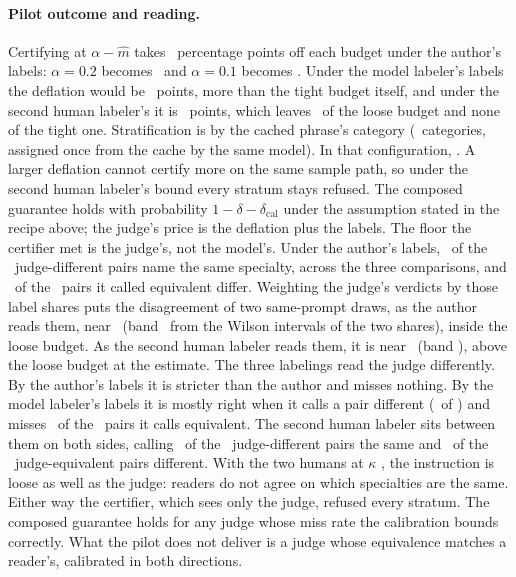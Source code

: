 \paragraph{Pilot outcome and reading.} Certifying at $\alpha - \hat{m}$
takes \pilotMissUcbPts\ percentage points off each budget under the
author's labels: $\alpha{=}0.2$ becomes
\pilotAlphaLooseEff\ and $\alpha{=}0.1$ becomes \pilotAlphaTightEff.
Under the model labeler's labels the deflation would be
\pilotAdjMissUcbPts\ points, more than the tight budget itself, and
under the second human labeler's it is \pilotSecondMissUcbPts\ points,
which leaves \pilotSecondAlphaLooseEff\ of the loose budget and none of
the tight one.
Stratification is by the cached phrase's category
(\pilotCategories\ categories, assigned once from the cache by the same
model). In that configuration,
\pilotOutcomes. A larger deflation cannot certify more on the same
sample path, so under the second human labeler's bound every stratum
stays refused. The composed guarantee holds with
probability $1-\delta-\delta_{\mathrm{cal}}$ under the assumption
stated in the recipe above; the judge's price is the deflation plus the labels. The
floor the certifier met is the judge's, not the model's. Under the
author's labels, \pilotFalseFlips\ of the \pilotLabeledDiff\
judge-different pairs name the same specialty, across the three
comparisons, and \pilotMisses\ of the \pilotLabeledSame\ pairs it
called equivalent differ. Weighting the judge's verdicts by those
label shares puts the disagreement of two same-prompt draws, as the
author reads them, near \pilotImpliedFloor\ (band
\pilotImpliedFloorBand\ from the Wilson intervals of the two shares),
inside the loose budget. As the second human labeler reads them, it is
near \pilotSecondImpliedFloor\ (band \pilotSecondImpliedFloorBand),
above the loose budget at the estimate. The three labelings read the judge differently.
By the author's labels it is stricter than the author and misses
nothing. By the model labeler's labels it is mostly right when it calls a pair
different (\pilotAdjDiffOnJudgeDiff\ of \pilotLabeledDiff) and misses
\pilotAdjMissesOnJudgeSame\ of the \pilotLabeledSame\ pairs it calls
equivalent. The second human labeler sits between them on both sides,
calling \pilotSecondFalseFlips\ of the \pilotLabeledDiff\
judge-different pairs the same and \pilotSecondMisses\ of the
\pilotLabeledSame\ judge-equivalent pairs different. With the two humans
at $\kappa$ \pilotSecondKappa, the instruction is loose as well as the
judge: readers do not agree on which specialties are the same. Either way the
certifier, which sees only the judge, refused every stratum. The
composed guarantee holds for any judge whose miss rate the calibration
bounds correctly. What the pilot does not deliver is a judge whose
equivalence matches a reader's, calibrated in both directions.
\par
\fi


